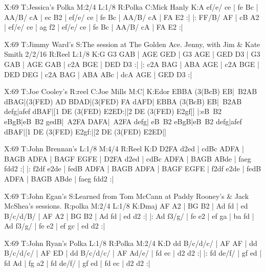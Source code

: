 \documentclass{article}
\begin{document}
\begin{abc}[name]
X:69
T:Jessica's Polka
M:2/4
L:1/8
R:Polka
C:Mick Hanly
K:A
ef/e/ ce | fe Bc | AA/B/ cA | ec B2 |
ef/e/ ce | fe Bc | AA/B/ cA | FA E2 :|
|: FF/B/ AF | cB A2 | ef/e/ ce | ag f2 |
ef/e/ ce | fe Bc | AA/B/ cA | FA E2 :|
\end{abc}

\begin{abc}[name]
X:69
T:Jimmy Ward's
S:The session at The Golden Ace. Jenny, with Jim & Kate Smith 2/2/16
R:Reel
L:1/8
K:G
G3 GAB | AGE GED | G3 AGE | GED D3 |
G3 GAB | AGE GAB | c2A BGE | DED D3 :|
|: c2A BAG | ABA AGE | c2A BGE | DED DEG |
c2A BAG | ABA ABc | dcA AGE | GED D3 :|
\end{abc}

\begin{abc}[name]
X:69
T:Joe Cooley's
R:reel
C:Joe Mills
M:C|
K:Edor
EBBA (3(BcB) EB|~B2AB dBAG|(3(FED) AD BDAD|(3(FED) FA dAFD|
EBBA (3(BcB) EB|~B2AB defg|afef dBAF|[1 DE (3(FED) E2ED:|[2 DE (3(FED) E2gf|]
|:eB~B2 eBgB|eB~B2 gedB|~A2FA DAFA|~A2FA defg|
eB~B2 eBgB|eB~B2 defg|afef dBAF|[1 DE (3(FED) E2gf:|[2 DE (3(FED) E2ED|]
\end{abc}

\begin{abc}[name]
X:69
T:John Brennan's
L:1/8
M:4/4
R:Reel
K:D
D2FA d2ed | cdBc ADFA | BAGB ADFA | BAGF EGFE |
D2FA d2ed | cdBc ADFA | BAGB ABde | faeg fdd2 :|
|: f2df e2de | fedB ADFA | BAGB ADFA | BAGF EGFE |
f2df e2de | fedB ADFA | BAGB ABde | faeg fdd2 :|
\end{abc}

\begin{abc}[name]
X:69
T:John Egan's
S:Learned from Tom McCann at Paddy Rooney's & Jack McShea's sessions.
R:polka
M:2/4
L:1/8
K:Dmaj
AF A2 | BG B2 | Ad fd | ed B/c/d/B/ |
AF A2 | BG B2 | Ad fd | ed d2 :|
|: Ad f3/g/ | fe e2 | ef ga | ba fd |
Ad f3/g/ | fe e2 | ef gc | ed d2 :|
\end{abc}

\begin{abc}[name]
X:69
T:John Ryan's Polka
L:1/8
R:Polka
M:2/4
K:D
dd B/c/d/c/ | AF AF | dd B/c/d/c/ | AF ED |
dd B/c/d/c/ | AF Ad/e/ | fd ec | d2 d2 :|
|: fd de/f/ | gf ed | fd Ad | fg a2 |
fd de/f/ | gf ed | fd ec | d2 d2 :| 
\end{abc}
\end{document}

